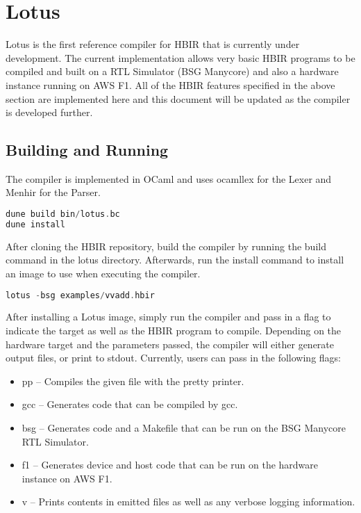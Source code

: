 \documentclass{article}
\begin{document}
\section{Lotus}
Lotus is the first reference compiler for HBIR that is currently under development. The current implementation allows very basic HBIR programs to be compiled and built on a RTL Simulator (BSG Manycore) and also a hardware instance running on AWS F1. All of the HBIR features specified in the above section are implemented here and this document will be updated as the compiler is developed further.

\subsection{Building and Running}
The compiler is implemented in OCaml and uses ocamllex for the Lexer and Menhir for the Parser. \\

\begin{minipage}[c]{\textwidth}
\begin{lstlisting}[language=C, caption=Build Lotus]
dune build bin/lotus.bc
dune install 
\end{lstlisting}
\end{minipage}

After cloning the HBIR repository, build the compiler by running the build command in the lotus directory. Afterwards, run the install command to install an image to use when executing the compiler. \\

\begin{minipage}[c]{\textwidth}
\begin{lstlisting}[language=C, caption=Declaring vector mappings for memory]
lotus -bsg examples/vvadd.hbir 
\end{lstlisting}
\end{minipage}

After installing a Lotus image, simply run the compiler and pass in a flag to indicate the target as well as the HBIR program to compile. Depending on the hardware target and the parameters passed, the compiler will either generate output files, or print to stdout. Currently, users can pass in the following flags:
\begin{itemize}
    \item pp -- Compiles the given file with the pretty printer.
    \item gcc -- Generates code that can be compiled by gcc.
    \item bsg -- Generates code and a Makefile that can be run on the BSG Manycore RTL Simulator.
    \item f1 -- Generates device and host code that can be run on the hardware instance on AWS F1.
    \item v -- Prints contents in emitted files as well as any verbose logging information.
\end{itemize}
\end{document}
